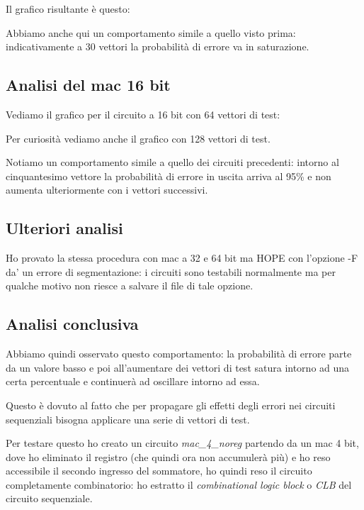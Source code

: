 \documentclass[12pt, letterpaper]{article}
\begin{document}
Il grafico risultante è questo:



Abbiamo anche qui un comportamento simile a quello visto prima: indicativamente a 30 vettori la probabilità di errore va in saturazione.

\subsection{Analisi del mac 16 bit}
Vediamo il grafico per il circuito a 16 bit con 64 vettori di test:



Per curiosità vediamo anche il grafico con 128 vettori di test.



Notiamo un comportamento simile a quello dei circuiti precedenti: intorno al cinquantesimo vettore la probabilità di errore in uscita arriva al 95\% e non aumenta ulteriormente con i vettori successivi.

\subsection{Ulteriori analisi}

Ho provato la stessa procedura con mac a 32 e 64 bit ma HOPE con l'opzione -F da' un errore di segmentazione: i circuiti sono testabili normalmente ma per qualche motivo non riesce a salvare il file di tale opzione.

\subsection{Analisi conclusiva}

Abbiamo quindi osservato questo comportamento: la probabilità di errore parte da un valore basso e poi all'aumentare dei vettori di test satura intorno ad una certa percentuale e continuerà ad oscillare intorno ad essa.

Questo è dovuto al fatto che per propagare gli effetti degli errori nei circuiti sequenziali bisogna applicare una serie di vettori di test.

Per testare questo ho creato un circuito \textit{mac\_4\_noreg} partendo da un mac 4 bit, dove ho eliminato il registro (che quindi ora non accumulerà più) e ho reso accessibile il secondo ingresso del sommatore, ho quindi reso il circuito completamente combinatorio: ho estratto il \textit{combinational logic block} o \textit{CLB} del circuito sequenziale.
\end{document}
